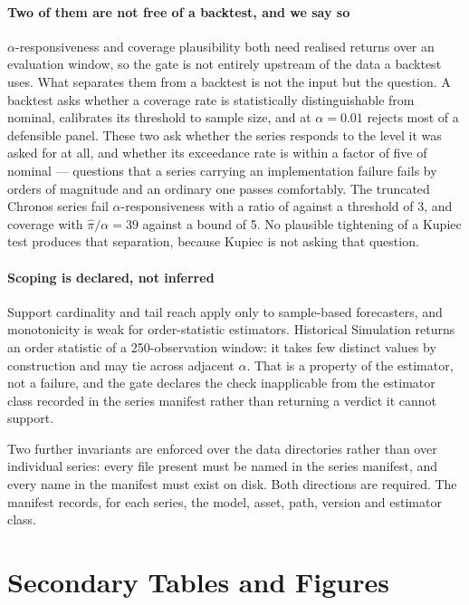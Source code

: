 \documentclass[preprint,11pt,authoryear]{elsarticle}
\newcommand{\1}{\boldsymbol{1}}
\begin{document}
\paragraph{Two of them are not free of a backtest, and we say so}
$\alpha$-responsiveness and coverage plausibility both need realised returns over
an evaluation window, so the gate is not entirely upstream of the data a backtest
uses. What separates them from a backtest is not the input but the question. A
backtest asks whether a coverage rate is statistically distinguishable from
nominal, calibrates its threshold to sample size, and at $\alpha = 0.01$ rejects
most of a defensible panel. These two ask whether the series responds to the
level it was asked for at all, and whether its exceedance rate is within a factor
of five of nominal --- questions that a series carrying an implementation failure
fails by orders of magnitude and an ordinary one passes comfortably. The truncated Chronos series fail
$\alpha$-responsiveness with a ratio of \nLitAlphaResp{} against a threshold of 3, and
coverage with $\hat\pi/\alpha = 39$ against a bound of 5. No plausible tightening
of a Kupiec test produces that separation, because Kupiec is not asking that
question.

\paragraph{Scoping is declared, not inferred} Support cardinality and tail reach
apply only to sample-based forecasters, and monotonicity is weak for
order-statistic estimators. Historical Simulation returns an order statistic of a
250-observation window: it takes few distinct values by construction and may tie
across adjacent $\alpha$. That is a property of the estimator, not a failure, and
the gate declares the check inapplicable from the estimator class recorded in the
series manifest rather than returning a verdict it cannot support.

Two further invariants are enforced over the data directories rather than over
individual series: every file present must be named in the series manifest, and
every name in the manifest must exist on disk. Both directions are required. The
manifest records, for each series, the model, asset, path, version and estimator
class.




\section{Secondary Tables and Figures}
\label{app:secondary}
\end{document}
